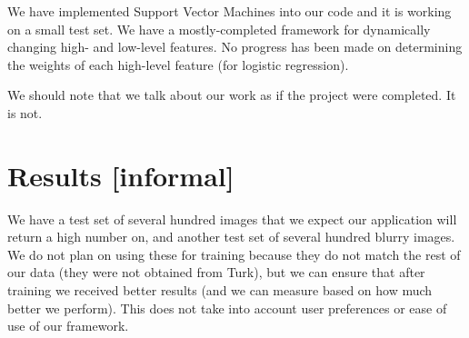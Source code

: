 \documentclass[10pt,twocolumn]{article}
\begin{document}
We have implemented Support Vector Machines into our code and it is working on a small test set. We have a mostly-completed framework for dynamically changing high- and low-level features. No progress has been made on determining the weights of each high-level feature (for logistic regression).

We should note that we talk about our work as if the project were completed. It is not.


\section{Results [informal]}
We have a test set of several hundred images that we expect our application will return a high number on, and another test set of several hundred blurry images. We do not plan on using these for training because they do not match the rest of our data (they were not obtained from Turk), but we can ensure that after training we received better results (and we can measure based on how much better we perform). This does not take into account user preferences or ease of use of our framework.



\end{document}
